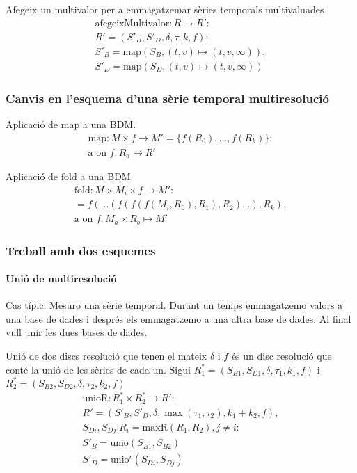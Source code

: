 Afegeix un multivalor per a emmagatzemar sèries temporals multivaluades
  \begin{gather*}
    \text{afegeixMultivalor}: R \longrightarrow R': \\
    R' = (S'_{B},S'_{D},\delta,\tau,k,f): \\
    S'_{B} = \text{map}(S_B,(t,v)\mapsto(t,v,\infty)), \\
    S'_{D} = \text{map}(S_D,(t,v)\mapsto(t,v,\infty))
  \end{gather*}




\subsubsection{Canvis en l'esquema d'una sèrie temporal multiresolució}

Aplicació de map a una BDM.
\begin{gather*}
  \text{map}: M \times f \longrightarrow M' = \{ f(R_0), \dotsc, f(R_k) \} :\\
   \text{a on } f: R_a \mapsto R'
 \end{gather*}
 
Aplicació de fold a una BDM
\begin{gather*}
  \text{fold}: M \times M_i \times f \longrightarrow M' :\\
  = f(\dots(f(f(f(M_i,R_0),R_1),R_2)\dots),R_k), \\
   \text{a on } f: M_a \times R_b \mapsto M'
\end{gather*}





\subsubsection{Treball amb dos esquemes}


\paragraph{Unió de multiresolució}

Cas típic:
Mesuro una sèrie temporal. Durant un temps emmagatzemo valors a una
base de dades i després els emmagatzemo a una altra base de dades. Al final vull unir les dues bases de dades.


Unió de dos discs resolució que tenen el mateix $\delta$ i $f$ és un
disc resolució que conté la unió de les sèries de cada un.  Sigui
$R_1^*=(S_{B1},S_{D1},\delta,\tau_1,k_1,f)$ i
$R_2^*=(S_{B2},S_{D2},\delta,\tau_2,k_2,f)$
  \begin{gather*}
    \text{unioR}: R_1^* \times R_2^* \longrightarrow R': \\
    R' = (S'_B,S'_D,\delta,\max(\tau_1,\tau_2),k_1+k_2,f), \\
    S_{Di}, S_{Dj} | R_i = \text{maxR}(R_1,R_2), j \neq i:  \\
    S'_B = \text{unio}(S_{B1},S_{B2})\\
    S'_D = \text{unio}^r(S_{Di},S_{Dj})
\end{gather*}

